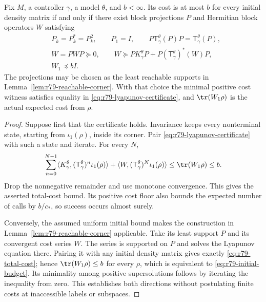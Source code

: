 \begin{theorem}
\label{thm:r79-exact-certificate}
Fix $M$, a controller $\gamma$, a model $\theta$, and $b<\infty$.
Its cost is at most $b$ for every initial density matrix if and only
if there exist block projections $P$ and Hermitian block operators
$W$ satisfying
\begin{align}
 &P_k=P_k^*=P_k^2,
 \qquad P_1=I,
 \qquad P\mathsf T^\theta_\gamma(P)P
                      =\mathsf T^\theta_\gamma(P),
                    \label{eq:r79-support-certificate}\\
 &W=PWP\succeq0,
 \qquad
 W\succeq PK^\theta_\gamma P
            +P(\mathsf T^\theta_\gamma)^*(W)P,
                    \label{eq:r79-lyapunov-certificate}\\
 &W_1\preccurlyeq bI.\label{eq:r79-initial-budget}
\end{align}
The projections may be chosen as the least reachable supports in
Lemma~\ref{lem:r79-reachable-corner}.  With that choice the minimal
positive cost witness satisfies equality in
\eqref{eq:r79-lyapunov-certificate}, and $\tr(W_1\rho)$ is the
actual expected cost from $\rho$.
\end{theorem}
\begin{proof}
Suppose first that the certificate holds.  Invariance keeps every
nonterminal state, starting from $\iota_1(\rho)$, inside its corner.
Pair \eqref{eq:r79-lyapunov-certificate} with such a state and
iterate.  For every $N$,
\[
 \sum_{n=0}^{N-1}
   \langle K^\theta_\gamma,
      (\mathsf T^\theta_\gamma)^n\iota_1(\rho)\rangle
 +\langle W,(\mathsf T^\theta_\gamma)^N\iota_1(\rho)\rangle
 \le\tr(W_1\rho)\le b.
\]
Drop the nonnegative remainder and use monotone convergence.  This
gives the asserted total-cost bound.  Its positive cost floor also
bounds the expected number of calls by $b/c_*$, so success occurs
almost surely.

Conversely, the assumed uniform initial bound makes the construction
in Lemma~\ref{lem:r79-reachable-corner} applicable.  Take its least
support $P$ and its convergent cost series $W$.  The series is
supported on $P$ and solves the Lyapunov equation there.  Pairing it
with any initial density matrix gives exactly
\eqref{eq:r79-total-cost}; hence $\tr(W_1\rho)\le b$ for every
$\rho$, which is equivalent to \eqref{eq:r79-initial-budget}.
Its minimality among positive supersolutions follows by iterating
the inequality from zero.  This establishes both directions without
postulating finite costs at inaccessible labels or subspaces.
\end{proof}

